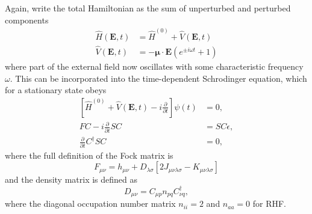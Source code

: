 Again, write the total Hamiltonian as the sum of unperturbed and perturbed components
\begin{align*}
  \hat{H}(\mathbf{E},t) &= \hat{H}^{(0)} + \hat{V}(\mathbf{E},t) \\
  \hat{V}(\mathbf{E},t) &= -\mathbf{\mu} \cdot \mathbf{E}(e^{\pm i \omega t} + 1) \tag{Karna 2}
\end{align*}
where part of the external field now oscillates with some characteristic frequency \(\omega\). This can be incorporated into the time-dependent Schrodinger equation, which for a stationary state obeys
\begin{align*}
  \left[ \hat{H}^{(0)} + \hat{V}(\mathbf{E},t) - i\frac{\partial}{\partial t} \right] \psi(t) &= 0, \tag{Karna 3} \\
  FC - i \frac{\partial}{\partial t} SC &= SC\epsilon, \tag{Karna 5} \\
  \frac{\partial}{\partial t} C^{\dagger} S C &= 0, \tag{Karna 6}
\end{align*}
where the full definition of the Fock matrix is
\begin{equation}
  F_{\mu\nu} = h_{\mu\nu} + D_{\lambda\sigma}[2J_{\mu\nu\lambda\sigma} - K_{\mu\nu\lambda\sigma}] \tag{Karna 9}
\end{equation}
and the density matrix is defined as
\begin{equation}
  D_{\mu\nu} = C_{\mu p}n_{pq}C_{\nu q}^{\dagger}, \tag{Karna 10}
\end{equation}
where the diagonal occupation number matrix \(n_{ii} = 2\) and \(n_{aa} = 0\) for RHF.

